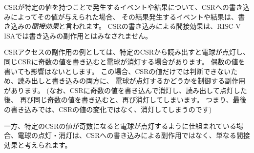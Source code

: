 CSRが特定の値を持つことで発生するイベントや結果について、CSRへの書き込みによってその値が与えられた場合、
その結果発生するイベントや結果は、書き込みの\emph{間接効果}と言われます。
CSRの書き込みによる間接効果は、RISC-V ISAでは書き込みの副作用とはみなされません。

\begin{commentary}
\begin{comment}
  An example of side effects for CSR accesses would be if reading from a
  specific CSR causes a light bulb to turn on, while writing an odd value
  to the same CSR causes the light to turn off.
  Assume writing an even value has no effect.
  In this case, both the read and write have side effects controlling
  whether the bulb is lit, as this condition is not determined solely
  from the CSR value.
  (Note that after writing an odd value to the CSR to turn off the light,
  then reading to turn the light on, writing again the same odd value
  causes the light to turn off again.
  Hence, on the last write, it is not a change in the CSR value that
  turns off the light.)
\end{comment}

CSRアクセスの副作用の例としては、特定のCSRから読み出すと電球が点灯し、
同じCSRに奇数の値を書き込むと電球が消灯する場合があります。
偶数の値を書いても影響はないとします。
この場合、CSRの値だけでは判断できないため、読み出しと書き込みの両方に、
電球が点灯するかどうかを制御する副作用があります。
(なお、CSRに奇数の値を書き込んで消灯し、読み出して点灯した後、
再び同じ奇数の値を書き込むと、再び消灯してしまいます。
つまり、最後の書き込みでは、CSRの値の変化ではなく、消灯してしまうのです)

\begin{comment}
  On the other hand, if a bulb is rigged to light whenever the value
  of a particular CSR is odd, then turning the light on and off is not
  considered a side effect of writing to the CSR but merely an indirect
  effect of such writes.
\end{comment}

一方、特定のCSRの値が奇数になると電球が点灯するように仕組まれている場合、電球の点灯・消灯は、CSRへの書き込みによる副作用ではなく、単なる間接効果と考えられます。

\begin{comment}
  More concretely, the RISC-V privileged architecture defined in
  Volume~II specifies that certain combinations of CSR values cause a
  trap to occur.
  When an explicit write to a CSR creates the conditions that trigger the
  trap, the trap is not considered a side effect of the write but merely
  an indirect effect.
\end{comment}


\end{commentary}
